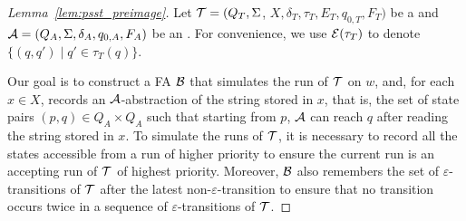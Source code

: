 \begin{proof}[Lemma~\ref{lem:psst_preimage}]
Let $\mathcal{T} = (Q_T, \Sigma$, $X, \delta_T, \tau_T, E_T,  q_{0, T}, F_T)$ be a \PSST{} and $\mathcal{A}
  = (Q_A, \Sigma, \delta_A, q_{0, A}, F_A)$ be an \FA{}. For convenience, we use $\mathcal{E}(\tau_T)$ to denote $\{(q, q') \mid q' \in \tau_T(q)\}$.

Our goal is to construct a FA $\mathcal{B}$ that simulates the run of $\mathcal{T}$ on $w$, and, for each $x \in X$, records an $\mathcal{A}$-abstraction of the string stored in $x$, that is, the set of state pairs $(p, q) \in Q_A \times Q_A$ such that starting from $p$, $\mathcal{A}$ can reach $q$ after reading the string stored in $x$. To simulate the runs of $\mathcal{T}$, it is necessary to record all the states accessible from a run of higher priority to ensure the current run is an accepting run of $\mathcal{T}$ of highest priority. Moreover, $\mathcal{B}$ also remembers the set of $\varepsilon$-transitions of $\mathcal{T}$ after the latest non-$\varepsilon$-transition to ensure that no transition occurs twice in a sequence of $\varepsilon$-transitions of $\mathcal{T}$.


\end{proof}
